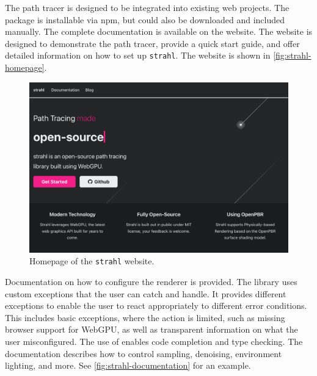 The path tracer is designed to be integrated into existing web projects. The package is installable via \gls{npm}, but could also be downloaded and included manually. The complete documentation is available on the website. The website is designed to demonstrate the path tracer, provide a quick start guide, and offer detailed information on how to set up \texttt{strahl}. The website is shown in \autoref{fig:strahl-homepage}.

\begin{figure}[H]
    \centering
    \includegraphics[width=0.95\columnwidth]{resources/website-home.png}
    \caption{Homepage of the \texttt{strahl} website.}
    \label{fig:strahl-homepage}
\end{figure}

Documentation on how to configure the renderer is provided. The library uses custom exceptions that the user can catch and handle. It provides different exceptions to enable the user to react appropriately to different error conditions. This includes basic exceptions, where the action is limited, such as missing browser support for \gls{WebGPU}, as well as transparent information on what the user misconfigured. The use of  enables code completion and type checking. The documentation describes how to control sampling, denoising, environment lighting, and more. See \autoref{fig:strahl-documentation} for an example.


